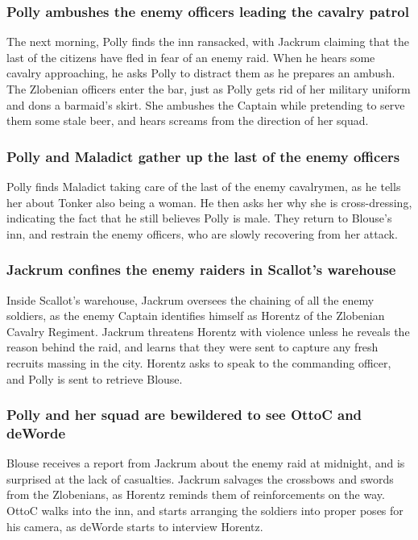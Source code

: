 \subsubsection{\Gls{Polly} ambushes the enemy officers leading the cavalry patrol}
The next morning, \Gls{Polly} finds the inn ransacked, with \Gls{Jackrum} claiming that the last of
the citizens have fled in fear of an enemy raid. When he hears some cavalry approaching, he asks
\Gls{Polly} to distract them as he prepares an ambush. The Zlobenian officers enter the bar, just
as \Gls{Polly} gets rid of her military uniform and dons a barmaid's skirt. She ambushes the
Captain while pretending to serve them some stale beer, and hears screams from the direction of
her squad.

\subsubsection{\Gls{Polly} and \Gls{Maladict} gather up the last of the enemy officers}
\Gls{Polly} finds \Gls{Maladict} taking care of the last of the enemy cavalrymen, as he tells her
about \Gls{Tonker} also being a woman. He then asks her why she is cross-dressing, indicating the
fact that he still believes \Gls{Polly} is male. They return to \Gls{Blouse}'s inn, and restrain
the enemy officers, who are slowly recovering from her attack.

\subsubsection{\Gls{Jackrum} confines the enemy raiders in \Gls{Scallot}'s warehouse}
Inside \Gls{Scallot}'s warehouse, \Gls{Jackrum} oversees the chaining of all the enemy soldiers,
as the enemy Captain identifies himself as \Gls{Horentz} of the Zlobenian Cavalry Regiment.
\Gls{Jackrum} threatens \Gls{Horentz} with violence unless he reveals the reason behind the raid,
and learns that they were sent to capture any fresh recruits massing in the city. \Gls{Horentz} asks
to speak to the commanding officer, and \Gls{Polly} is sent to retrieve \Gls{Blouse}.

\subsubsection{\Gls{Polly} and her squad are bewildered to see \Gls{OttoC} and \Gls{deWorde}}
\Gls{Blouse} receives a report from \Gls{Jackrum} about the enemy raid at midnight, and is surprised
at the lack of casualties. \Gls{Jackrum} salvages the crossbows and swords from the Zlobenians, as
\Gls{Horentz} reminds them of reinforcements on the way. \Gls{OttoC} walks into the inn, and starts
arranging the soldiers into proper poses for his camera, as \Gls{deWorde} starts to interview
\Gls{Horentz}.

